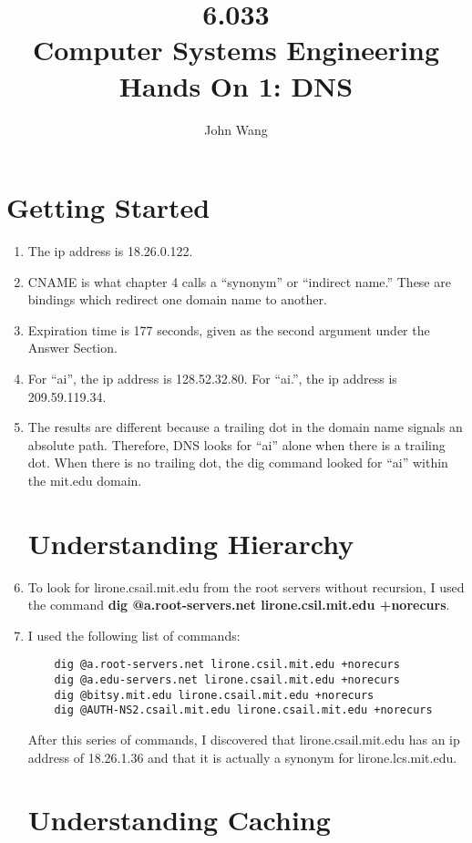 \documentclass[psamsfonts]{amsart}
\title{6.033 \\
Computer Systems Engineering \\
Hands On 1: DNS}
\author{John Wang}
\begin{document}
\maketitle

\section{Getting Started}

\begin{enumerate}
  \item The ip address is 18.26.0.122.
  \item CNAME is what chapter 4 calls a ``synonym'' or ``indirect name.'' These are bindings which redirect one domain name to another.
  \item Expiration time is 177 seconds, given as the second argument under the Answer Section.
  \item For ``ai'', the ip address is 128.52.32.80. For ``ai.'', the ip address is 209.59.119.34.
  \item The results are different because a trailing dot in the domain name signals an absolute path. Therefore, DNS looks for ``ai'' alone when there is a trailing dot. When there is no trailing dot, the dig command looked for ``ai'' within the mit.edu domain.

\section{Understanding Hierarchy}

  \item To look for lirone.csail.mit.edu from the root servers without recursion, I used the command \textbf{dig @a.root-servers.net lirone.csil.mit.edu +norecurs}. 
  \item I used the following list of commands:
    \begin{verbatim}
    dig @a.root-servers.net lirone.csil.mit.edu +norecurs
    dig @a.edu-servers.net lirone.csail.mit.edu +norecurs
    dig @bitsy.mit.edu lirone.csail.mit.edu +norecurs
    dig @AUTH-NS2.csail.mit.edu lirone.csail.mit.edu +norecurs
    \end{verbatim}

    After this series of commands, I discovered that lirone.csail.mit.edu has an ip address of 18.26.1.36 and that it is actually a synonym for lirone.lcs.mit.edu.

\section{Understanding Caching}


\end{enumerate}
\end{document}

